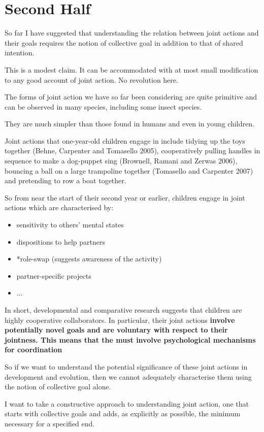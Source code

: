 \documentclass[14pt,a4paper]{extarticle}
\begin{document}
\section{Second Half}

So far I have suggested that understanding the relation between joint actions and their goals requires the notion of collective goal in addition to that of shared intention.

This is a modest claim.  It can be accommodated with at most small modification to any good account of joint action.  No revolution here.

The forms of joint action we have so far been considering are quite primitive and can be observed in many species, including some insect species.

They are much simpler than those found in humans and even in young children.  

Joint actions that one-year-old children engage in include tidying up the toys together (Behne, Carpenter and Tomasello 2005), cooperatively pulling handles in sequence to make a dog-puppet sing (Brownell, Ramani and Zerwas 2006), bouncing a ball on a large trampoline together (Tomasello and Carpenter 2007) and pretending to row a boat together. 

So from near the start of their second year or earlier, children engage in joint actions which are characterised by:
%
\begin{itemize}
\item sensitivity to others' mental states \citep{Buttelmann:2009gy}
\item dispositions to help partners \citep{Warneken:2006qe}
\item *role-swap (suggests awareness of the activity)
\item partner-specific projects \citep{Liebal:2010lr}
\item ...
\end{itemize}
%
In short, developmental and comparative research suggests that children are highly cooperative collaborators.  
In particular, their joint actions \textbf{involve potentially novel goals and are voluntary with respect to their jointness.  This means that the must involve psychological mechanisms for coordination}

So if we want to understand the potential significance of these joint actions in development and evolution, then we cannot adequately characterise them using the notion of collective goal alone.

I want to take a constructive approach to understanding joint action, one that starts with collective goals and adds, as explicitly as possible, the minimum necessary for a specified end.
\end{document}
